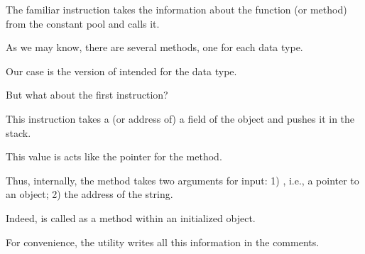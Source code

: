 The familiar  instruction takes the information about the  
function (or method) from the constant pool and calls it.

As we may know, there are several  methods, one for each data type.

Our case is the version of  intended for the  data type.


But what about the first  instruction?

This instruction takes a  (or address of) a field of the object  
and pushes it in the stack.

This value is acts like the  pointer for the  method.

Thus, internally, the  method takes two arguments for input:
1) , i.e., a pointer to an object; 
2) the address of the  string.


Indeed,  is called as a method within an initialized  object.


For convenience, the  utility writes all this information in the comments.

